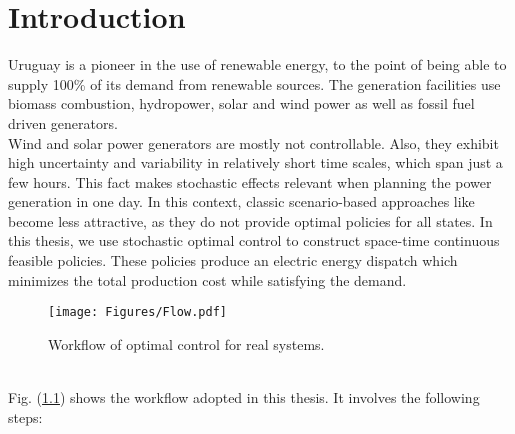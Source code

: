 \chapter{Introduction}

Uruguay is a pioneer in the use of renewable energy, to the point 
of being able to supply 100\% of its demand from renewable sources. 
The generation facilities use biomass combustion, hydropower, solar and wind 
power \cite{secretariat2018global} as well as fossil fuel driven generators.\\
Wind and solar power generators are mostly not controllable. Also, they exhibit high uncertainty \cite{foley2012current} and variability in relatively short time scales, which span just a few hours. This fact makes stochastic effects relevant when planning the power generation in one day.  In this context, classic scenario-based approaches like \cite{de2010optimal}  become less attractive, as they do not provide optimal policies for all states. In this thesis,  we use stochastic optimal control to construct space-time continuous feasible policies. These policies produce an electric energy dispatch which minimizes the total production cost while satisfying the demand. 
\begin{figure}[ht!]
\centering
\texttt{[image: Figures/Flow.pdf]}
\caption{Workflow of optimal control for real systems.}
\label{Flow_Control}
\end{figure}\\
Fig. (\ref{Flow_Control}) shows the workflow adopted in this thesis. It involves 
the following steps:

